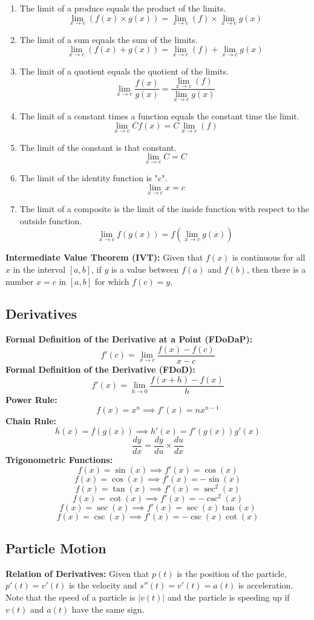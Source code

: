 \documentclass[12pt, letterpaper]{article}
\begin{document}
\begin{enumerate}
    \item The limit of a produce equals the product of the limits. \[\lim_{x\rightarrow c}(f(x)\times g(x))=\lim_{x\rightarrow c}(f)\times\lim_{x\rightarrow c}g(x)\]
    \item The limit of a sum equals the sum of the limits. \[\lim_{x\rightarrow c}(f(x)+ g(x))=\lim_{x\rightarrow c}(f)+\lim_{x\rightarrow c}g(x)\]
    \item The limit of a quotient equals the quotient of the limits. \[\lim_{x\rightarrow c}\frac{f(x)}{g(x)}=\frac{\lim_{x\rightarrow c}(f)}{\lim_{x\rightarrow c}g(x)}\]
    \item The limit of a constant times a function equals the constant time the limit. \[\lim_{x\rightarrow c}Cf(x)=C\lim_{x\rightarrow c}(f)\]
    \item The limit of the constant is that constant. \[\lim_{x\rightarrow c}C=C\]
    \item The limit of the identity function is "c". \[\lim_{x\rightarrow c}x=c\]
    \item The limit of a composite is the limit of the inside function with respect to the outside function. \[\lim_{x\rightarrow c}f(g(x))=f(\lim_{x\rightarrow c}g(x))\]
\end{enumerate}
\textbf{Intermediate Value Theorem (IVT):} Given that $f(x)$ is continuous for all $x$ in the interval $[a,b]$, if $y$ is a value between $f(a)$ and $f(b)$, then there is a number $x=c$ in $[a,b]$ for which $f(c)=y$.

\subsection{Derivatives}
\textbf{Formal Definition of the Derivative at a Point (FDoDaP):} \[f'(c)=\lim_{x\rightarrow c}\frac{f(x)-f(c)}{x-c}\]
\textbf{Formal Definition of the Derivative (FDoD):} \[f'(x)=\lim_{h\rightarrow 0}\frac{f(x+h)-f(x)}{h}\]
\textbf{Power Rule:} \[f(x)=x^n \implies f'(x)=nx^{n-1}\]
\textbf{Chain Rule:} \[h(x)=f(g(x)) \implies h'(x)=f'(g(x))g'(x)\] \[\frac{dy}{dx}=\frac{dy}{du}\times\frac{du}{dx}\]
\textbf{Trigonometric Functions:} \[f(x)=\sin(x) \implies f'(x)=\cos(x)\] \[f(x)=\cos(x) \implies f'(x)=-\sin(x)\] \[f(x)=\tan(x) \implies f'(x)=\sec^2(x)\] \[f(x)=\cot(x) \implies f'(x)=-\csc^2(x)\] \[f(x)=\sec(x) \implies f'(x)=\sec(x)\tan(x)\] \[f(x)=\csc(x) \implies f'(x)=- \csc(x)\cot(x)\]

\subsection{Particle Motion}
\textbf{Relation of Derivatives:} Given that $p(t)$ is the position of the particle, $p'(t)=v'(t)$ is the velocity and $s''(t)=v'(t)=a(t)$ is acceleration. Note that the speed of a particle is $|v(t)|$ and the particle is speeding up if $v(t)$ and $a(t)$ have the same sign. 
\end{document}
